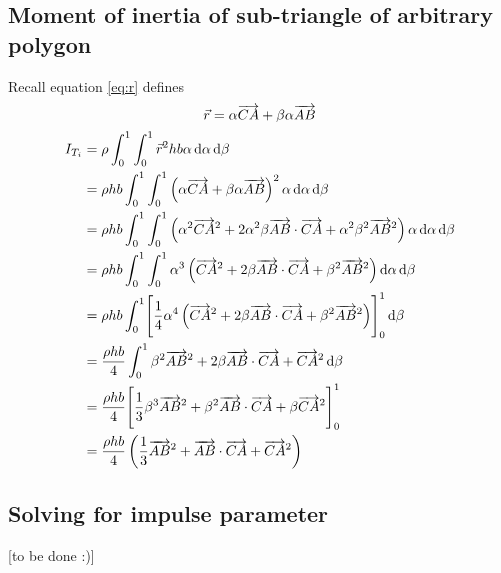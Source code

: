 \subsection{Moment of inertia of sub-triangle of arbitrary polygon} Recall
equation \ref{eq:r} defines
$$ \vec r = \alpha \overrightarrow{CA} + \beta \alpha \overrightarrow{AB} $$
\begin{equation}
	\label{eq:subtriangle_arbitrary_moment_long}
	\begin{split}
		I_{T_i} &= \rho \int_0^1 \int_0^1 \vec r^2 hb \alpha  \diff \alpha \diff \beta\\
		&=\rho hb\int_0^1 \int_0^1 \left(\alpha \vv{CA} + \beta \alpha \vv{AB}\right)^2 \alpha  \diff \alpha \diff \beta\\
		&=\rho hb\int_0^1 \int_0^1 \left(\alpha^2 \vv{CA}^2 + 2 \alpha^2 \beta \vv{AB} \cdot \vv{CA} + \alpha^2 \beta^2 \vv{AB}^2\right) \alpha  \diff \alpha \diff \beta\\
		&=\rho hb\int_0^1 \int_0^1 \alpha^3 \left(\vv{CA}^2 + 2 \beta \vv{AB} \cdot \vv{CA} + \beta^2 \vv{AB}^2\right) \diff \alpha \diff \beta\\
		&=\rho hb\int_0^1 \Biggl[\frac{1}{4} \alpha^4 \left(\vv{CA}^2 + 2 \beta \vv{AB} \cdot \vv{CA} + \beta^2 \vv{AB}^2\right) \Biggr]_0^1\diff \beta\\
		&= \frac{\rho hb}{4}\int_0^1 \beta^2 \vv{AB}^2 + 2 \beta \vv{AB} \cdot \vv{CA} + \vv{CA}^2 \diff \beta\\
		&= \frac{\rho hb}{4} \Biggl[\frac{1}{3} \beta^3 \vv{AB}^2 + \beta^2 \vv{AB} \cdot \vv{CA} + \beta\vv{CA}^2 \Biggr]_0^1\\
		&= \frac{\rho hb}{4} \left(\frac{1}{3}\vv{AB}^2 + \vv{AB} \cdot \vv{CA} + \vv{CA}^2\right) \\
	\end{split}
\end{equation}

\newpage
\subsection{Solving for impulse parameter}
\label{app:impulse_long}
[to be done :)]
\begin{equation}
\end{equation}
